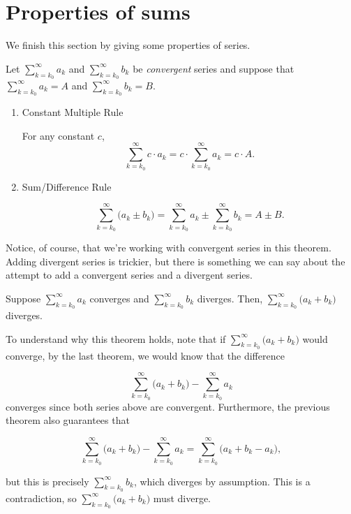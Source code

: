 \documentclass{ximera}
\begin{document}
\section{Properties of sums}

We finish this section by giving some properties of series.

\begin{theorem}
  Let  $\sum_{k=k_0}^\infty a_k$ and  $\sum_{k=k_0}^\infty b_k$ be \emph{convergent} series and suppose that $
  \sum_{k=k_0}^\infty a_k = A$ and $\sum_{k=k_0}^\infty b_k =B.$
 
 \begin{enumerate}
\item Constant Multiple Rule 

For any constant $c$, \[\sum_{k=k_0}^\infty c\cdot a_k =
  c\cdot\sum_{k=k_0}^\infty a_k = c\cdot A.\]
\item Sum/Difference Rule 

\[\sum_{k=k_0}^\infty \big(a_k\pm b_k\big) =
  \sum_{k=k_0}^\infty a_k \pm \sum_{k=k_0}^\infty b_k = A \pm B.\]
\end{enumerate} 
\end{theorem}


Notice, of course, that we're working with convergent series in this 
theorem.  Adding divergent series is trickier, but there is something we can say about the attempt to add a convergent series and a divergent series.

\begin{theorem}
 Suppose $\sum_{k=k_0}^\infty a_k$ converges and  $\sum_{k=k_0}^\infty b_k$ diverges.  Then, $\sum_{k=k_0}^{\infty} \big(a_k+b_k\big)$ diverges.
\end{theorem}

To understand why this theorem holds, note that if $\sum_{k=k_0}^\infty \big(a_k+b_k\big)$ would converge, by the last theorem, we would know that the difference

\[\sum_{k=k_0}^\infty \big(a_k+b_k\big) -\sum_{k=k_0}^\infty a_k\]
converges since both series above are convergent.  Furthermore, the previous theorem also guarantees that

\[\sum_{k=k_0}^\infty \big(a_k+b_k\big) -\sum_{k=k_0}^\infty a_k = \sum_{k=k_0}^\infty \big(a_k+b_k -a_k\big),\]

but this is precisely $\sum_{k=k_0}^{\infty} b_k$, which diverges by assumption.  This is a contradiction, so  $\sum_{k=k_0}^\infty \big(a_k+b_k\big)$ must diverge.
\end{document}
